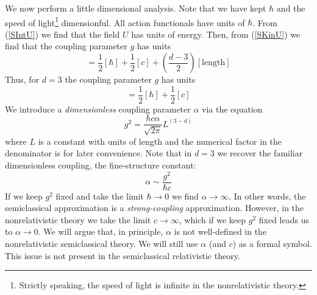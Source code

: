 We now perform a little dimensional analysis. Note that we have kept $\hbar$ and the speed of light\footnote{Strictly speaking, the speed of light is infinite in the nonrelativistic theory.} dimensionful. All action functionals have units of $\hbar$. From (\ref{SIntU}) we find that the field $U$ has units of energy. Then, from (\ref{SKinU}) we find that the coupling parameter $g$ has units
\begin{equation}
	[g] = \frac{1}{2} [\hbar] + \frac{1}{2} [c] + \left( \frac{d - 3}{2} \right) [\text{length}]
\end{equation}
Thus, for $d = 3$ the coupling parameter $g$ has units
\begin{equation}
	[g] = \frac{1}{2} [\hbar] + \frac{1}{2} [c]
\end{equation}
We introduce a \textit{dimensionless} coupling parameter $\alpha$ via the equation
\begin{equation}
	g^{2} = \frac{\hbar c \alpha}{\sqrt{2 \pi}} L^{(3 - d)}
\end{equation}
where $L$ is a constant with units of length and the numerical factor in the denominator is for later convenience. Note that in $d = 3$ we recover the familiar dimensionless coupling, the fine-structure constant:
\begin{equation}
	\alpha \sim \frac{g^{2}}{\hbar c}
\end{equation}
If we keep $g^{2}$ fixed and take the limit $\hbar \rightarrow 0$ we find $\alpha \rightarrow \infty$. In other words, the semiclassical approximation is a \textit{strong-coupling} approximation. However, in the nonrelativistic theory we take the limit $c \rightarrow \infty$, which if we keep $g^{2}$ fixed leads us to $\alpha \rightarrow 0$. We will argue that, in principle, $\alpha$ is not well-defined in the nonrelativistic semiclassical theory. We will still use $\alpha$ (and $c$) as a formal symbol. This issue is not present in the semiclassical relativistic theory.
